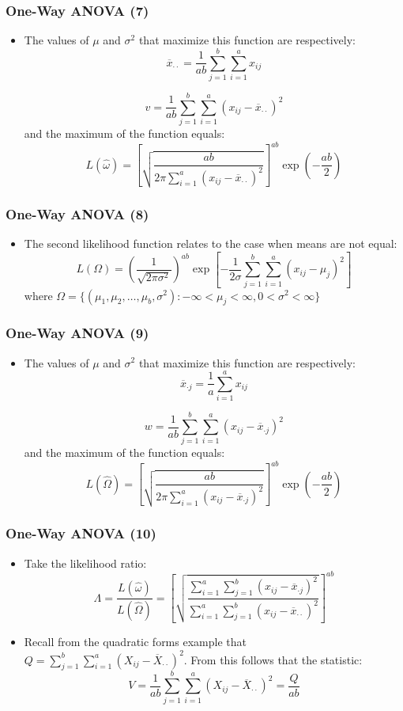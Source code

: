 \documentclass[10pt]{beamer}
\theoremstyle{definition}
\begin{document}
\begin{frame}[fragile]
\frametitle{One-Way ANOVA (7)}
\begin{itemize}
	\item The values of $\mu$ and $\sigma^{2}$ that maximize this function are respectively:
	\[
		\overline{x}_{\cdot\cdot} = \frac{1}{ab}\sum_{j=1}^{b}\sum_{i=1}^{a}x_{ij}
	\]
	
	\[
		v = \frac{1}{ab}\sum_{j=1}^{b}\sum_{i=1}^{a}(x_{ij} - \overline{x}_{\cdot\cdot})^{2}
	\]
	and the maximum of the function equals:	
	\[
		L(\widehat{\omega}) = \left[\sqrt{\frac{ab}{2\pi\sum_{i=1}^{a}(x_{ij} - \overline{x}_{\cdot\cdot})^{2}}}\right]^{ab}\exp\left(-\frac{ab}{2}\right)
	\]
\end{itemize}
\end{frame}

\begin{frame}[fragile]
\frametitle{One-Way ANOVA (8)}
\begin{itemize}
	\item The second likelihood function relates to the case when means are not equal:
	\[
		L(\Omega) = \left(\frac{1}{\sqrt{2\pi\sigma^{2}}}\right)^{ab}\exp\left[-\frac{1}{2\sigma}\sum_{j=1}^{b}\sum_{i=1}^{a}(x_{ij} - \mu_{j})^{2}\right]
	\]
	where $\Omega = \{(\mu_{1},\mu_{2},\ldots,\mu_{b},\sigma^{2}): -\infty < \mu_{j} < \infty, 0 < \sigma^{2} < \infty\}$ 
\end{itemize}
\end{frame}

\begin{frame}[fragile]
\frametitle{One-Way ANOVA (9)}
\begin{itemize}
	\item The values of $\mu$ and $\sigma^{2}$ that maximize this function are respectively:
	\[
		\overline{x}_{\cdot j} = \frac{1}{a}\sum_{i=1}^{a}x_{ij}
	\]
	
	\[
		w = \frac{1}{ab}\sum_{j=1}^{b}\sum_{i=1}^{a}(x_{ij} - \overline{x}_{\cdot j})^{2}
	\]
	and the maximum of the function equals:	
	\[
		L(\widehat{\Omega}) = \left[\sqrt{\frac{ab}{2\pi\sum_{i=1}^{a}(x_{ij} - \overline{x}_{\cdot j})^{2}}}\right]^{ab}\exp\left(-\frac{ab}{2}\right)
	\]
\end{itemize}
\end{frame}

\begin{frame}[fragile]
\frametitle{One-Way ANOVA (10)}
\begin{itemize}
	\item Take the likelihood ratio:
	\[
		\Lambda = \frac{L(\widehat{\omega})}{L(\widehat{\Omega})} = \left[\sqrt{\frac{\displaystyle \sum_{i=1}^{a}\sum_{j=1}^{b}(x_{ij} - \overline{x}_{\cdot j})^{2}}{\displaystyle \sum_{i=1}^{a}\sum_{j=1}^{b}(x_{ij} - \overline{x}_{\cdot \cdot})^{2}}}\right]^{ab}
	\]
	\item Recall from the quadratic forms example that $\displaystyle Q =  \sum_{j=1}^{b}\sum_{i=1}^{a}(X_{ij} - \overline{X}_{\cdot\cdot})^{2}$. From this follows that the statistic:
	\[
		V = \frac{1}{ab}\sum_{j=1}^{b}\sum_{i=1}^{a}(X_{ij} - \overline{X}_{\cdot\cdot})^{2} = \frac{Q}{ab}
	\]
\end{itemize}
\end{frame}
\end{document}
